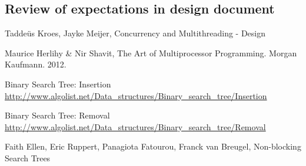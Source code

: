 \documentclass[a4paper]{article}
\begin{document}


\subsection{Review of expectations in design document}


\begin{thebibliography}{}
    Taddeüs Kroes, Jayke Meijer, Concurrency and Multithreading - Design

    Maurice Herlihy \& Nir Shavit, The Art of Multiprocessor Programming. Morgan Kaufmann.
    2012.

    Binary Search Tree: Insertion
    \url{http://www.algolist.net/Data_structures/Binary_search_tree/Insertion}

    Binary Search Tree: Removal
    \url{http://www.algolist.net/Data_structures/Binary_search_tree/Removal}

    Faith Ellen, Eric Ruppert, Panagiota Fatourou, Franck van Breugel, Non-blocking Search
    Trees

\end{thebibliography}
\end{document}
